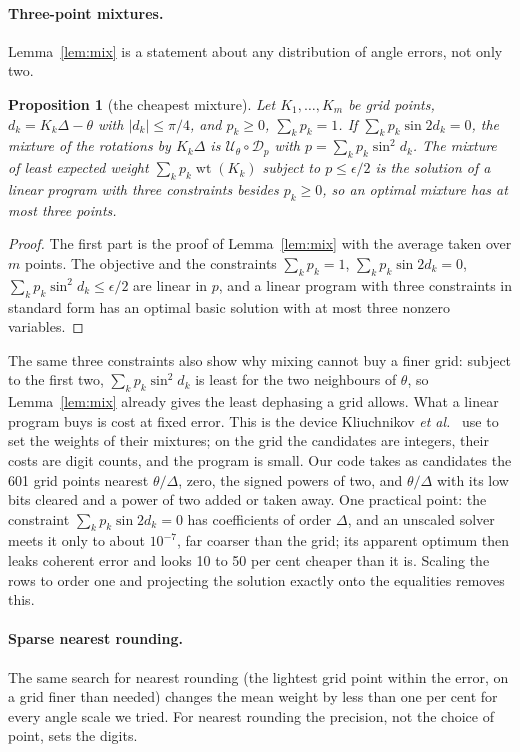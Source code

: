 \documentclass[aps,prx,twocolumn,superscriptaddress,nofootinbib,longbibliography]{revtex4-2}
\newtheorem{proposition}[theorem]{Proposition}
\theoremstyle{remark}
\newcommand{\wt}{\operatorname{wt}}
\begin{document}
\paragraph*{Three-point mixtures.}
Lemma~\ref{lem:mix} is a statement about any distribution of angle errors, not only two.

\begin{proposition}[the cheapest mixture]\label{prop:lp}
Let $K_1,\dots,K_m$ be grid points, $d_k=K_k\Delta-\theta$ with $|d_k|\le\pi/4$, and $p_k\ge0$,
$\sum_kp_k=1$. If $\sum_kp_k\sin2d_k=0$, the mixture of the rotations by $K_k\Delta$ is
$\mathcal U_\theta\circ\mathcal D_p$ with $p=\sum_kp_k\sin^2d_k$. The mixture of least expected
weight $\sum_kp_k\wt(K_k)$ subject to $p\le\epsilon/2$ is the solution of a linear program with
three constraints besides $p_k\ge0$, so an optimal mixture has at most three points.
\end{proposition}

\begin{proof}
The first part is the proof of Lemma~\ref{lem:mix} with the average taken over $m$ points. The
objective and the constraints $\sum_kp_k=1$, $\sum_kp_k\sin2d_k=0$, $\sum_kp_k\sin^2d_k\le
\epsilon/2$ are linear in $p$, and a linear program with three constraints in standard form has
an optimal basic solution with at most three nonzero variables.
\end{proof}

The same three constraints also show why mixing cannot buy a finer grid: subject to the first
two, $\sum_kp_k\sin^2d_k$ is least for the two neighbours of $\theta$, so Lemma~\ref{lem:mix}
already gives the least dephasing a grid allows. What a linear program buys is cost at fixed
error. This is the device Kliuchnikov \textit{et al.}~\cite{Kliuchnikov2023} use to set the
weights of their mixtures; on the grid the candidates are integers, their costs are digit
counts, and the program is small. Our code takes as candidates the 601 grid points nearest
$\theta/\Delta$, zero, the signed powers of two, and $\theta/\Delta$ with its low bits cleared
and a power of two added or taken away. One practical point: the constraint
$\sum_kp_k\sin2d_k=0$ has coefficients of order $\Delta$, and an unscaled solver meets it only to
about $10^{-7}$, far coarser than the grid; its apparent optimum then leaks coherent error and
looks 10 to 50 per cent cheaper than it is. Scaling the rows to order one and projecting the
solution exactly onto the equalities removes this.

\paragraph*{Sparse nearest rounding.}
The same search for nearest rounding (the lightest grid point within the error, on a grid finer
than needed) changes the mean weight by less than one per cent for every angle scale we tried.
For nearest rounding the precision, not the choice of point, sets the digits.
\end{document}
